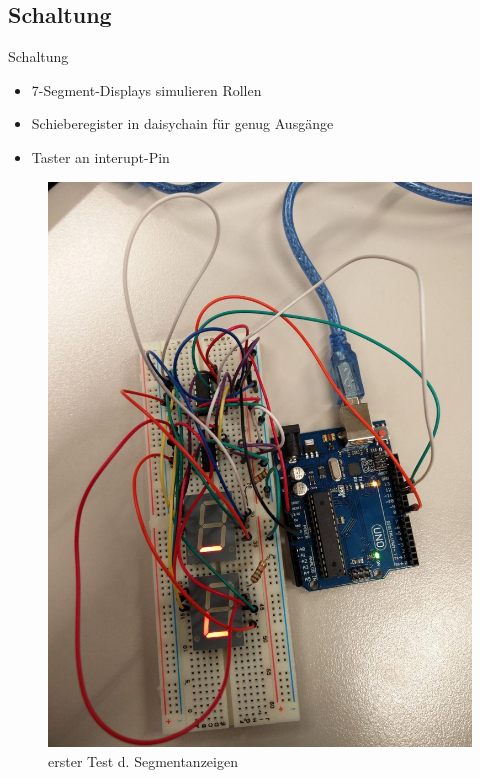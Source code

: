 \documentclass[mathserif,9pt]{beamer}
\begin{document}
    \subsection{Schaltung}
    \begin{frame}{Schaltung}
        \begin{block}{}
            \begin{minipage}[c]{0.6\textwidth}
                \begin{itemize}
                    \item 7-Segment-Displays simulieren Rollen
                    \item Schieberegister in daisychain für genug Ausgänge
                    \item Taster an interupt-Pin 
                \end{itemize}
            \end{minipage}
            \hfill
            \begin{minipage}[c]{0.3\textwidth}
               \begin{figure} 
                    \includegraphics[width=\textwidth]{img/breadboard.jpg}
                    \caption{erster Test d. Segmentanzeigen}
                    \label{fig:breadboard}
               \end{figure}
            \end{minipage}
        \end{block}
    \end{frame}
\end{document}
